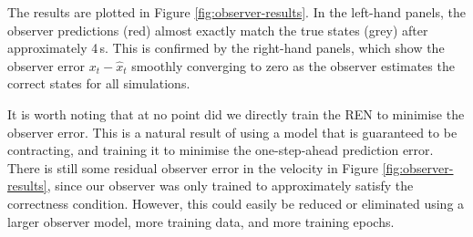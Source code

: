 The results are plotted in Figure \ref{fig:observer-results}. In the left-hand panels, the observer predictions (red) almost exactly match the true states (grey) after approximately 4\,s. This is confirmed by the right-hand panels, which show the observer error $x_t - \hat{x}_t$ smoothly converging to zero as the observer estimates the correct states for all simulations. 

It is worth noting that at no point did we directly train the REN to minimise the observer error. This is a natural result of using a model that is guaranteed to be contracting, and training it to minimise the one-step-ahead prediction error. There is still some residual observer error in the velocity in Figure \ref{fig:observer-results}, since our observer was only trained to approximately satisfy the correctness condition. However, this could easily be reduced or eliminated using a larger observer model, more training data, and more training epochs.